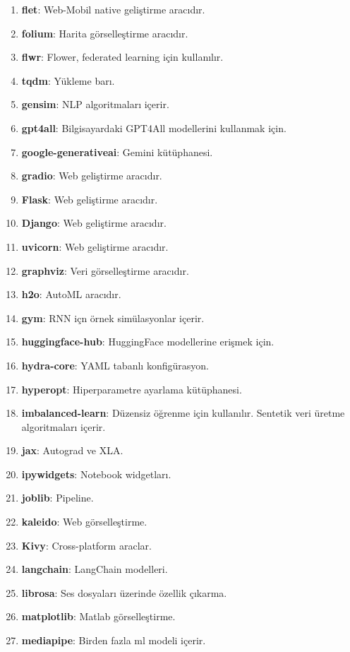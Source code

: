 \begin{enumerate}
    \item \textbf{flet}: Web-Mobil native geliştirme aracıdır.
    \item \textbf{folium}: Harita görselleştirme aracıdır.
    \item \textbf{flwr}: Flower, federated learning için kullanılır.
    \item \textbf{tqdm}: Yükleme barı.
    \item \textbf{gensim}: NLP algoritmaları içerir.
    \item \textbf{gpt4all}: Bilgisayardaki GPT4All modellerini kullanmak için.
    \item \textbf{google-generativeai}: Gemini kütüphanesi.
    \item \textbf{gradio}: Web geliştirme aracıdır.
    \item \textbf{Flask}: Web geliştirme aracıdır.
    \item \textbf{Django}: Web geliştirme aracıdır.
    \item \textbf{uvicorn}: Web geliştirme aracıdır.
    \item \textbf{graphviz}: Veri görselleştirme aracıdır.
    \item \textbf{h2o}: AutoML aracıdır.
    \item \textbf{gym}: RNN içn örnek simülasyonlar içerir.
    \item \textbf{huggingface-hub}: HuggingFace modellerine erişmek için.
    \item \textbf{hydra-core}: YAML tabanlı konfigürasyon.
    \item \textbf{hyperopt}: Hiperparametre ayarlama kütüphanesi.
    \item \textbf{imbalanced-learn}: Düzensiz öğrenme için kullanılır. Sentetik veri üretme algoritmaları içerir.
    \item \textbf{jax}: Autograd ve XLA.
    \item \textbf{ipywidgets}: Notebook widgetları.
    \item \textbf{joblib}: Pipeline.
    \item \textbf{kaleido}: Web görselleştirme.
    \item \textbf{Kivy}: Cross-platform araclar.
    \item \textbf{langchain}: LangChain modelleri.
    \item \textbf{librosa}: Ses dosyaları üzerinde özellik çıkarma.
    \item \textbf{matplotlib}: Matlab görselleştirme.
    \item \textbf{mediapipe}: Birden fazla ml modeli içerir.

\end{enumerate}
